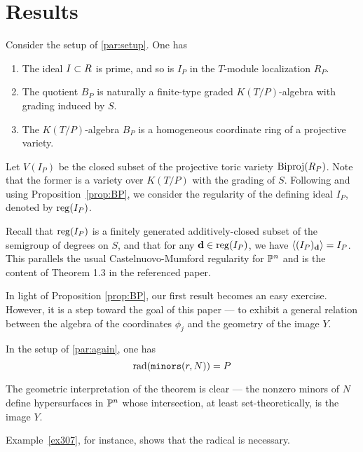 \documentclass[fleqn,reqno]{amsart}
\begin{document}
\section{Results}
\label{sec:results}

\begin{proposition}
\label{prop:BP} Consider the setup of \eqref{par:setup}. One has
\begin{enumerate}
\item
The ideal $I\subset R$ is prime, and so is $I_P$ in the $T$-module localization $R_P$.

\item
The quotient $B_P$ is naturally a finite-type graded $K(T/P)$-algebra with grading induced by $S$.

\item\label{itm:BPKTP-alg}
The $K(T/P)$-algebra $B_P$ is a homogeneous coordinate ring of a projective variety.
\end{enumerate}
\end{proposition}

\begin{paragraf}
\label{par:reg-IP}
Let $V(I_P)$ be the closed subset of the projective toric variety $\operatorname{Biproj}(R_P)$.
Note that the former is a variety over $K(T/P)$ with the grading of $S$.
Following \citet{MS-04} and using Proposition~\ref{prop:BP},
we consider the regularity of the defining ideal $I_P$,
denoted by $\operatorname{reg}(I_P)$.

Recall that $\operatorname{reg}(I_P)$ is a finitely generated additively-closed subset
of the semigroup of degrees on $S$, and that
for any $\mathbf d\in\operatorname{reg}(I_P)$, we have $\langle(I_P)_\mathbf d\rangle=I_P$.
This parallels the usual Castelnuovo-Mumford regularity for $\mathbb{P}^n$
and is the content of Theorem 1.3 in the referenced paper.
\end{paragraf}

\begin{paragraf*}
In light of Proposition \ref{prop:BP}, our first result becomes an easy exercise.
However, it is a step toward the goal of this paper --- to exhibit a general relation between
the algebra of the coordinates $\phi_j$ and the geometry of the image $Y$.
\end{paragraf*}

\begin{theorem}
\label{thm:rad-minors}
In the setup of \eqref{par:again}, one has
\[
	\operatorname{rad}(\mathop{\tt minors}(r,N))=P
\]
\end{theorem}

\begin{paragraf*}
The geometric interpretation of the theorem is clear ---
the nonzero minors of $N$ define hypersurfaces in $\mathbb{P}^n$ whose intersection,
at least set-theoretically, is the image $Y$.

Example~\ref{ex307}, for instance, shows that the radical is necessary.
\end{paragraf*}
\end{document}

